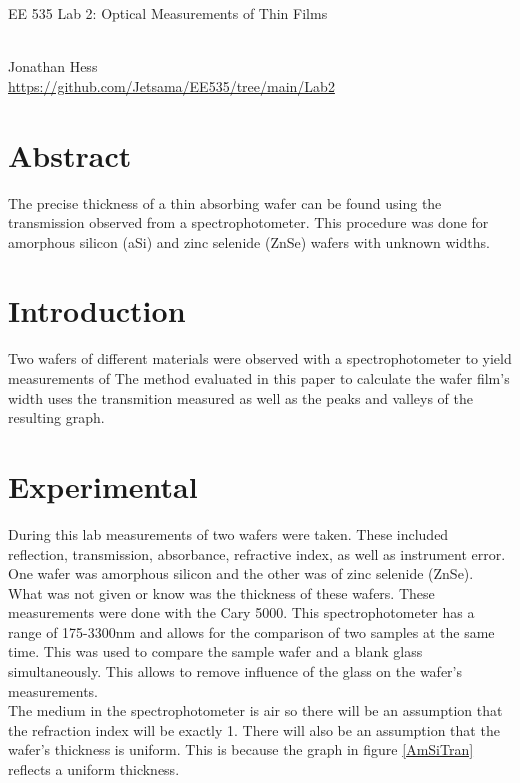 \documentclass[10pt,a4paper]{article}
\begin{document}
\begin{multicols}{2}
\newenvironment{indentPar}[1]%
 {\begin{list}{}%
         {\setlength{\leftmargin}{#1}}%
         \item[]%
 }
 {\end{list}}

\begin{flushleft}
\begin{LARGE}EE 535 Lab 2: Optical Measurements of Thin Films
\end{LARGE}
\\Jonathan Hess
\\\href{https://github.com/Jetsama/EE535/tree/main/Lab2}{https://github.com/Jetsama/EE535/tree/main/Lab2}
\end{flushleft}


\section*{Abstract}

The precise thickness of a thin absorbing wafer can be found using the transmission observed from a spectrophotometer. This procedure was done for amorphous silicon (aSi) and zinc selenide (ZnSe) wafers with unknown widths.





\section*{Introduction}

Two wafers of different materials were observed with a spectrophotometer to yield measurements of The method evaluated in this paper to calculate the wafer film's width uses the transmition measured as well as the peaks and valleys of the resulting graph. 






\section*{Experimental}
During this lab measurements of two wafers were taken. These included reflection, transmission, absorbance, refractive index, as well as instrument error. One wafer was amorphous silicon and the other was of zinc selenide (ZnSe). What was not given or know was the thickness of these wafers. These measurements were done with the Cary 5000. This spectrophotometer has a range of 175-3300nm \cite{carry} and allows for the comparison of two samples at the same time. This was used to compare the sample wafer and a blank glass simultaneously. This allows to remove influence of the glass on the wafer's measurements.\\
The medium in the spectrophotometer is air so there will be an assumption that the refraction index will be exactly 1. There will also be an assumption that the wafer's thickness is uniform. This is because the graph in figure \ref{AmSiTran} reflects a uniform thickness\cite{paper}.





\end{multicols}
\end{document}

